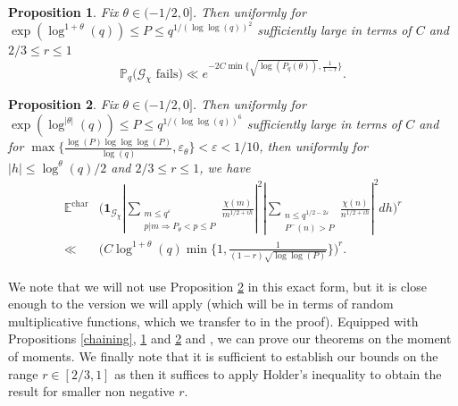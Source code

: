 \documentclass[reqno]{amsart}
\newtheorem{proposition}{Proposition}[section]
\theoremstyle{definition}
\theoremstyle{remark}
\numberwithin{equation}{section}
\theoremstyle{remark}
\begin{document}
\begin{proposition}
    Fix $\theta \in (-1/2,0]$. Then uniformly for $\exp(\log^{1+\theta}(q)) \leq P \leq q^{1/(\log\log(q))^2}$ sufficiently large in terms of $C$ and $2/3 \leq r \leq 1$
    $$\mathbb{P}_q\big(\mathcal{G}_\chi \text{ fails}\big) \ll e^{-2C\min\{\sqrt{\log(P_q(\theta))},\frac{1}{1-r}\}}.$$ \label{bad_chaining_moment}
\end{proposition}
\begin{proposition}
    Fix $\theta \in (-1/2,0]$. Then uniformly for $\exp(\log^{|\theta|}(q)) \leq P \leq q^{1/(\log\log(q))^6}$ sufficiently large in terms of $C$ and \\ for $\max\{\frac{\log(P)\log\log\log(P)}{\log(q)},\varepsilon_\theta\}<\varepsilon < 1/10$, then uniformly for $|h| \leq \log^{\theta}(q)/2$ and $2/3 \leq r \leq 1$, we have
    \begin{align*}
        \mathbb{E}^{\text{char}}&\big(\mathbf{1}_{\mathcal{G}_\chi}|\sum_{\substack{m \leq q^\varepsilon \\ p|m \Rightarrow P_\theta < p \leq P}}\frac{\chi(m)}{m^{1/2+ih}}|^2|\sum_{\substack{n \leq q^{1/2-2\varepsilon} \\ P^{-}(n) > P}}\frac{\chi(n)}{n^{1/2+ih}}|^2dh\big)^r \\ \ll& \big(C\log^{1+\theta}(q)\min\{1,\frac{1}{(1-r)\sqrt{\log\log(P)}}\}\big)^r.
    \end{align*}\label{good_moment_bound}
\end{proposition}
We note that we will not use Proposition \ref{good_moment_bound} in this exact form, but it is close enough to the version we will apply (which will be in terms of random multiplicative functions, which we transfer to in the proof). Equipped with Propositions \ref{chaining}, \ref{bad_chaining_moment} and \ref{good_moment_bound} and , we can prove our theorems on the moment of moments. We finally note that it is sufficient to establish our bounds on the range $r \in[2/3,1]$ as then it suffices to apply Holder's inequality to obtain the result for smaller non negative $r$.
\end{document}
